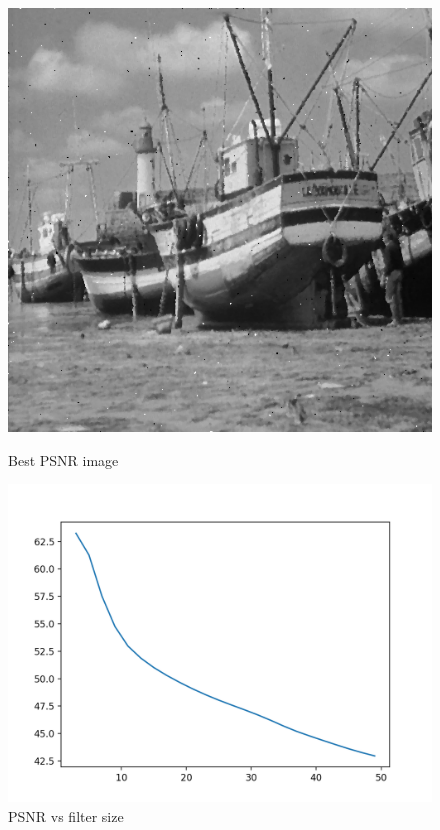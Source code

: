 \documentclass{article}
\begin{document}
    \begin{figure}[!htb]
      \includegraphics[scale=0.3]{./basic_denoising/boat/median_best_sp.png}
      \caption{Best PSNR image}
    \endminipage \hfill
      \includegraphics[scale=.45]{./basic_denoising/boat/median_psnr_sp.png}
      \caption{PSNR vs filter size}
    \endminipage
    \end{figure}
    \pagebreak
\end{document}
